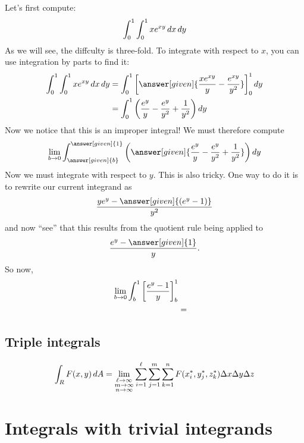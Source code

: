 \documentclass{ximera}
\begin{document}
\begin{example}
\begin{image}
  \end{image}
  \begin{explanation}
    Let's first compute:
    \[
    \int_0^1 \int_0^1 x e^{xy} \mathop{}\!d x \mathop{}\!d y
    \]
    As we will see, the diffculty is three-fold. To integrate with respect to $x$, you
    can use integration by parts to find it:
    \begin{align*}
      \int_0^1 \int_0^1 x e^{xy} \d x \d y &= \int_0^1 \eval{\answer[given]{\frac{xe^{xy}}{y}-\frac{e^{xy}}{y^2}}}_0^1\d y\\
      &= \int_0^1 \left(\frac{e^{y}}{y}-\frac{e^y}{y^2} + \frac{1}{y^2}\right)\d y
    \end{align*}
    Now we notice that this is an improper integral!
    We must therefore compute
    \[
    \lim_{b\to0}\int_{\answer[given]{b}}^{\answer[given]{1}} \left(\answer[given]{\frac{e^{y}}{y}-\frac{e^y}{y^2} + \frac{1}{y^2}}\right)\d y
    \]
    Now we must integrate with respect to $y$. This is also
    tricky. One way to do it is to rewrite our current integrand as
    \[
    \frac{y e^y - \answer[given]{(e^y -1)}}{y^2}
    \]
    and now ``see'' that this results from the quotient rule being
    applied to
    \[
    \frac{e^y-\answer[given]{1}}{y}.
    \]
    So now,
    \begin{align*}
      \lim_{b\to 0}\int_b^1 \bigg[ \frac{e^y-1}{y} \bigg]_b^1\\
      &= 
    \end{align*}
  \end{explanation}
\end{example}








\subsection{Triple integrals}


\[
\int_R F(x,y) \mathop{}\!d A = \lim_{\substack{\ell\to\infty\\ m\to\infty\\ n\to\infty}}\sum_{i=1}^\ell\sum_{j=1}^m \sum_{k=1}^n F(x^*_i,y^*_j,z_k^*)\Delta x\Delta y\Delta z
\]


\section{Integrals with trivial integrands}
\end{document}

